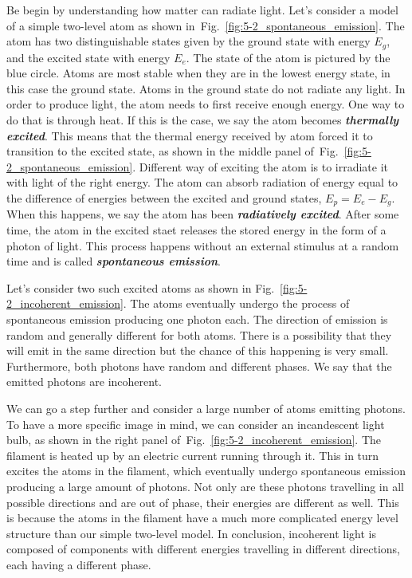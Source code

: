 Be begin by understanding how matter can radiate light.
Let's consider a model of a simple two-level atom as shown in~Fig.~\ref{fig:5-2_spontaneous_emission}.
The atom has two distinguishable states given by the ground state with energy $E_g$, and the excited state with energy $E_e$.
The state of the atom is pictured by the blue circle.
Atoms are most stable when they are in the lowest energy state, in this case the ground state.
Atoms in the ground state do not radiate any light.
In order to produce light, the atom needs to first receive enough energy.
One way to do that is through heat.
If this is the case, we say the atom becomes \textbf{\emph{thermally excited}}.
This means that the thermal energy received by atom forced it to transition to the excited state, as shown in the middle panel of~Fig.~\ref{fig:5-2_spontaneous_emission}.
Different way of exciting the atom is to irradiate it with light of the right energy.
The atom can absorb radiation of energy equal to the difference of energies between the excited and ground states, $E_p = E_e - E_g$.
When this happens, we say the atom has been \textbf{\emph{radiatively excited}}.
After some time, the atom in the excited staet releases the stored energy in the form of a photon of light.
This process happens without an external stimulus at a random time and is called \textit{\textbf{spontaneous emission}}.

Let's consider two such excited atoms as shown in Fig.~\ref{fig:5-2_incoherent_emission}.
The atoms eventually undergo the process of spontaneous emission producing one photon each.
The direction of emission is random and generally different for both atoms.
There is a possibility that they will emit in the same direction but the chance of this happening is very small.
Furthermore, both photons have random and different phases.
We say that the emitted photons are incoherent.

We can go a step further and consider a large number of atoms emitting photons.
To have a more specific image in mind, we can consider an incandescent light bulb, as shown in the right panel of~Fig.~\ref{fig:5-2_incoherent_emission}.
The filament is heated up by an electric current running through it.
This in turn excites the atoms in the filament, which eventually undergo spontaneous emission producing a large amount of photons.
Not only are these photons travelling in all possible directions and are out of phase, their energies are different as well.
This is because the atoms in the filament have a much more complicated energy level structure than our simple two-level model.
In conclusion, incoherent light is composed of components with different energies travelling in different directions, each having a different phase.

